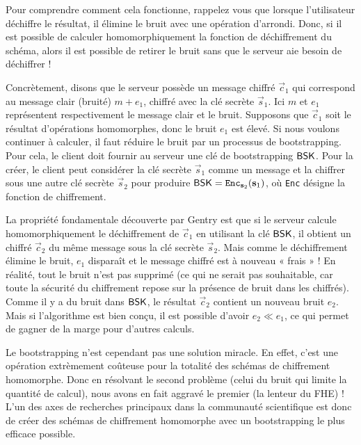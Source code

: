 Pour comprendre comment cela fonctionne, rappelez vous que lorsque l'utilisateur déchiffre le résultat, il élimine le bruit avec une opération d'arrondi. Donc, si il est possible de calculer homomorphiquement la fonction de déchiffrement du schéma, alors il est possible de retirer le bruit sans que le serveur aie besoin de déchiffrer ! 

Concrètement, disons que le serveur possède un message chiffré $\vec c_1$ qui correspond au message clair (bruité) $m + e_1$, chiffré avec la clé secrète $\vec s_1$. Ici $m$ et $e_1$ représentent respectivement le message clair et le bruit. Supposons que $\vec c_1$ soit le résultat d’opérations homomorphes, donc le bruit $e_1$ est élevé. Si nous voulons continuer à calculer, il faut réduire le bruit par un processus de bootstrapping.
Pour cela, le client doit fournir au serveur une clé de bootstrapping $\textsf{BSK}$. Pour la créer, le client peut considérer la clé secrète $\vec s_1$ comme un message et la chiffrer sous une autre clé secrète $\vec s_2$ pour produire $\textsf{BSK} = \texttt{Enc}_{\mathbf s_2}(\mathbf s_1)$, où \texttt{Enc} désigne la fonction de chiffrement.

La propriété fondamentale découverte par Gentry est que si le serveur calcule homomorphiquement le déchiffrement de $\vec c_1$ en utilisant la clé $\textsf{BSK}$, il obtient un chiffré $\vec c_2$ du même message sous la clé secrète $\vec s_2$. Mais comme le déchiffrement élimine le bruit, $e_1$ disparaît et le message chiffré est à nouveau « frais » !
En réalité, tout le bruit n’est pas supprimé (ce qui ne serait pas souhaitable, car toute la sécurité du chiffrement repose sur la présence de bruit dans les chiffrés). Comme il y a du bruit dans $\textsf{BSK}$, le résultat $\vec c_2$ contient un nouveau bruit $e_2$. Mais si l'algorithme est bien conçu, il est possible d’avoir $e_2 \ll e_1$, ce qui permet de gagner de la marge pour d’autres calculs.


Le bootstrapping n'est cependant pas une solution miracle. En effet, c'est une opération extrèmement coûteuse pour la totalité des schémas de chiffrement homomorphe. Donc en résolvant le second problème (celui du bruit qui limite la quantité de calcul), nous avons en fait aggravé le premier (la lenteur du FHE) ! L'un des axes de recherches principaux dans la communauté scientifique est donc de créer des schémas de chiffrement homomorphe avec un bootstrapping le plus efficace possible. 



